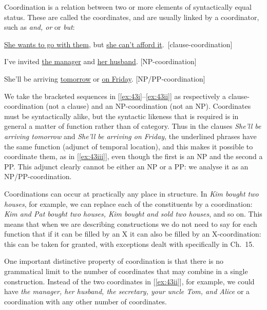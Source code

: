 Coordination is a relation between two or more elements of syntactically equal status. These are called the {coordinates}, and are usually linked by a {coordinator}, such as \textit{and, or} or \textit{but}:
\begin{examples}
\item \label{ex:43}
    \begin{examples}
        \item \label{ex:43i} \ob \uline{She wants to go with them}, but \uline{she can't afford it}.\cb~\hfill \textnormal{[clause-coordination]}
        \item \label{ex:43ii} I've invited \ob \uline{the manager} and \uline{her husband}\cb. \hfill \textnormal{[NP-coordination]}
        \item \label{ex:43iii} She'll be arriving \ob \uline{tomorrow} or \uline{on Friday}\cb. \hfill \textnormal{[NP/PP-coordination]}
    \end{examples}
\end{examples}
We take the bracketed sequences in [\ref{ex:43i}--\ref{ex:43ii}] as respectively a clause-coordination (not a clause) and an NP-coordination (not an NP). Coordinates must be syntactically alike, but the syntactic likeness that is required is in general a matter of function rather than of category. Thus in the clauses \textit{She'll be arriving tomorrow} and \textit{She'll be arriving on Friday}, the underlined phrases have the same function (adjunct of temporal location), and this makes it possible to coordinate them, as in [\ref{ex:43iii}], even though the first is an NP and the second a PP. This adjunct clearly cannot be either an NP or a PP: we analyse it as an NP/PP-coordination.

Coordinations can occur at practically any place in structure. In \textit{Kim bought two houses}, for example, we can replace each of the constituents by a coordination: \textit{Kim and Pat bought two houses, Kim bought and sold two houses}, and so on. This means that when we are describing constructions we do not need to say for each function that if it can be filled by an X it can also be filled by an X-coordination: this can be taken for granted, with exceptions dealt with specifically in Ch.~15.

One important distinctive property of coordination is that there is no grammatical limit to the number of coordinates that may combine in a single construction. Instead of the two coordinates in [\ref{ex:43ii}], for example, we could have \textit{the manager, her husband, the secretary, your uncle Tom, and Alice} or a coordination with any other number of coordinates.

